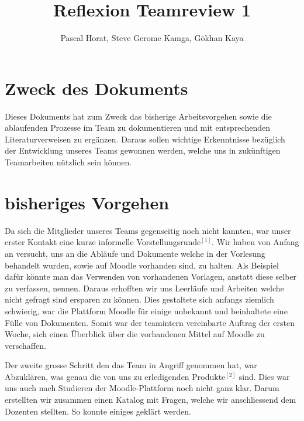 \documentclass[12pt]{article}
\title{Reflexion Teamreview 1}
\author{Pascal Horat, Steve Gerome Kamga, Gökhan Kaya}
\begin{document}
\maketitle

\tableofcontents

\section{Zweck des Dokuments}

Dieses Dokuments hat zum Zweck das bisherige Arbeitsvorgehen sowie die ablaufenden Prozesse im Team zu dokumentieren und mit entsprechenden Literaturverweisen zu ergänzen. Daraus sollen wichtige Erkenntnisse bezüglich der Entwicklung unseres Teams gewonnen werden, welche uns in zukünftigen Teamarbeiten nützlich sein können.

\section{bisheriges Vorgehen}

Da sich die Mitglieder unseres Teams gegenseitig noch nicht kannten, war unser erster Kontakt eine kurze informelle Vorstellungsrunde$^{[1]}$. Wir haben von Anfang an versucht, uns an die Abläufe und Dokumente welche in der Vorlesung behandelt wurden, sowie auf Moodle vorhanden sind, zu halten. Als Beispiel dafür könnte man das Verwenden von vorhandenen Vorlagen, anstatt diese selber zu verfassen, nennen. Daraus erhofften wir uns Leerläufe und Arbeiten welche nicht gefragt sind ersparen zu können. Dies gestaltete sich anfangs ziemlich schwierig, war die Plattform Moodle für einige unbekannt und beinhaltete eine Fülle von Dokumenten. Somit war der teamintern vereinbarte Auftrag der ersten Woche, sich einen Überblick über die vorhandenen Mittel auf Moodle zu verschaffen.

Der zweite grosse Schritt den das Team in Angriff genommen hat, war Abzuklären, was genau die von uns zu erledigenden Produkte$^{[2]}$ sind. Dies war uns auch nach Studieren der Moodle-Plattform noch nicht ganz klar. Darum erstellten wir zusammen einen Katalog mit Fragen, welche wir anschliessend dem Dozenten stellten. So konnte einiges geklärt werden.
\end{document}
